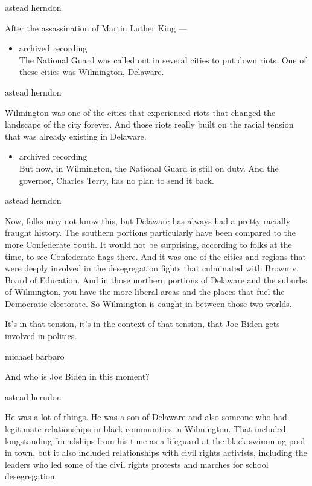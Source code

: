 astead herndon

After the assassination of Martin Luther King ---

\begin{itemize}
\tightlist
\item
  archived recording\\
  The National Guard was called out in several cities to put down riots.
  One of these cities was Wilmington, Delaware.
\end{itemize}

astead herndon

Wilmington was one of the cities that experienced riots that changed the
landscape of the city forever. And those riots really built on the
racial tension that was already existing in Delaware.

\begin{itemize}
\tightlist
\item
  archived recording\\
  But now, in Wilmington, the National Guard is still on duty. And the
  governor, Charles Terry, has no plan to send it back.
\end{itemize}

astead herndon

Now, folks may not know this, but Delaware has always had a pretty
racially fraught history. The southern portions particularly have been
compared to the more Confederate South. It would not be surprising,
according to folks at the time, to see Confederate flags there. And it
was one of the cities and regions that were deeply involved in the
desegregation fights that culminated with Brown v. Board of Education.
And in those northern portions of Delaware and the suburbs of
Wilmington, you have the more liberal areas and the places that fuel the
Democratic electorate. So Wilmington is caught in between those two
worlds.

It's in that tension, it's in the context of that tension, that Joe
Biden gets involved in politics.

michael barbaro

And who is Joe Biden in this moment?

astead herndon

He was a lot of things. He was a son of Delaware and also someone who
had legitimate relationships in black communities in Wilmington. That
included longstanding friendships from his time as a lifeguard at the
black swimming pool in town, but it also included relationships with
civil rights activists, including the leaders who led some of the civil
rights protests and marches for school desegregation.


